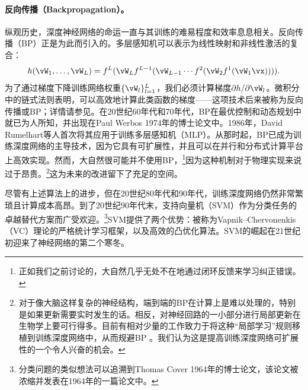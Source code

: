 \documentclass[../../book-main_zh.tex]{subfiles}
\begin{document}
\paragraph{反向传播（Backpropagation）。}
纵观历史，深度神经网络的命运一直与其训练的难易程度和效率息息相关。反向传播（BP）正是为此而引入的。多层感知机可以表示为线性映射和非线性激活的复合：
\begin{equation}
    h(\vW_{1}, \ldots, \vW_{L}) = f^{L}(\vW_{L}f^{L-1}(\vW_{L-1}
    \cdots f^{2}(\vW_{2}f^{1}(\vW_{1}\vx)))).
\end{equation}
为了通过梯度下降训练网络权重\(\{\vW_{l}\}_{l=1}^{L}\)，我们必须计算梯度\(\partial h/\partial
\vW_{l}\)。微积分中的链式法则表明，可以高效地计算此类函数的梯度——这项技术后来被称为反向传播或BP；详情请参见。在20世纪60年代和70年代，BP在最优控制和动态规划中就已为人所知，并出现在Paul
Werbos 1974年的博士论文中\cite{Werbos-1974, Werbos1994TheRO}。1986年，David
Rumelhart等人首次将其应用于训练多层感知机（MLP）\cite{Rumelhart1986}。从那时起，BP已成为训练深度网络的主导技术，因为它具有可扩展性，并且可以在并行和分布式计算平台上高效实现。然而，大自然很可能并不使用BP，\footnote{正如我们之前讨论的，大自然几乎无处不在地通过闭环反馈来学习纠正错误。}因为这种机制对于物理实现来说过于昂贵。\footnote{对于像大脑这样复杂的神经结构，端到端的BP在计算上是难以处理的，特别是如果更新需要实时发生的话。相反，对神经回路的一小部分进行局部更新在生物学上要可行得多。目前有相对少量的工作致力于将这种“局部学习”规则移植到训练深度网络中，从而规避BP
\cite{baldi2016theory,millidge2022predictive,li2025noprop}。我们认为这是提高训练深度网络可扩展性的一个令人兴奋的机会。}这为未来的改进留下了充足的空间。

尽管有上述算法上的进步，但在20世纪80年代和90年代，训练深度网络仍然非常繁琐且计算成本高昂。到了20世纪90年代末，支持向量机（SVM）\cite{SVM-1995}作为分类任务的卓越替代方案而广受欢迎。\footnote{分类问题的类似想法可以追溯到Thomas
    Cover
1964年的博士论文，该论文被浓缩并发表在1964年的一篇论文中\cite{Cover-1964}。}SVM提供了两个优势：被称为Vapnik--Chervonenkis（VC）理论的严格统计学习框架，以及高效的凸优化算法\cite{BoydVa04}。SVM的崛起在21世纪初迎来了神经网络的第二个寒冬。
\end{document}
